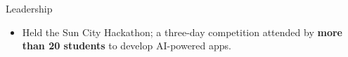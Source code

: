 \documentclass{resume} %
\begin{document}
\begin{workSection}{Leadership}
    \customItem[
        title=Treasurer - Association for Computing Machinery at UTEP,
        duration=August 2022 - January 2024
    ]
    \begin{itemize}
        \vspace{-0.5em}
        \itemsep -6pt {}
        \item Held the Sun City Hackathon; a three-day competition attended by \textbf{more than 20 students} to develop AI-powered apps.
    \end{itemize}
\end{workSection}

\end{document}
